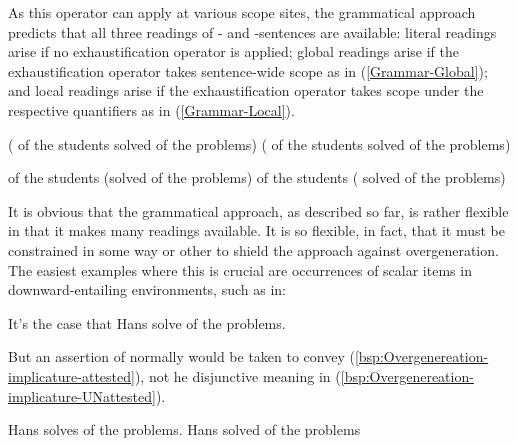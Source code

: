\documentclass[fleqn,reqno,10pt,draft]{article}
\newcommand{\as}{\acro{as}}
\renewcommand{\es}{\acro{es}}
\newcommand{\exh}{\ensuremath{\mathrm{Exh}}}
\begin{document}
As this operator can apply at various scope sites, the grammatical
approach predicts that all three readings of \as- and \es-sentences
are available: literal readings arise if no exhaustification operator
is applied; global readings arise if the exhaustification operator
takes sentence-wide scope as in (\ref{Grammar-Global}); and local
readings arise if the exhaustification operator takes scope under the
respective quantifiers as in (\ref{Grammar-Local}).

\begin{exe}
  \ex \label{Grammar-Global}
    \begin{xlist}
      \ex \label{Grammar-Global-AE} \mymark{$\exh$}( of the students solved
         of the problems)
      \ex \label{Grammar-Global-GE} \mymark{$\exh$}( of the students solved
         of the problems)
    \end{xlist}
\end{exe}

\begin{exe}
  \ex \label{Grammar-Local}
    \begin{xlist}
      \ex \label{Grammar-Local-AE}  of the students \mymark{$\exh$}(solved
         of the problems)
      \ex \label{Grammar-Local-GE}  of the
        students \mymark{$\exh$}( solved
         of the problems)
    \end{xlist}
\end{exe}

It is obvious that the grammatical approach, as described so far, is
rather flexible in that it makes many readings available. It is so
flexible, in fact, that it must be constrained in some way or other to
shield the approach against overgeneration. The easiest examples where
this is crucial are occurrences of scalar items in downward-entailing
environments, such as in:

\begin{exe}
\ex \label{bsp:Overgenereation-target} It's  the case that
  Hans solve  of the problems.
\end{exe}

\noindent But an assertion of normally would be taken to convey
(\ref{bsp:Overgenereation-implicature-attested}), not he disjunctive
meaning in (\ref{bsp:Overgenereation-implicature-UNattested}).

\begin{exe}
\ex 
  \begin{xlist}
  \ex \label{bsp:Overgenereation-implicature-attested} Hans solves  of the problems.
  \ex \label{bsp:Overgenereation-implicature-UNattested} Hans solved
     of the problems 
  \end{xlist}
\end{exe}
\end{document}

